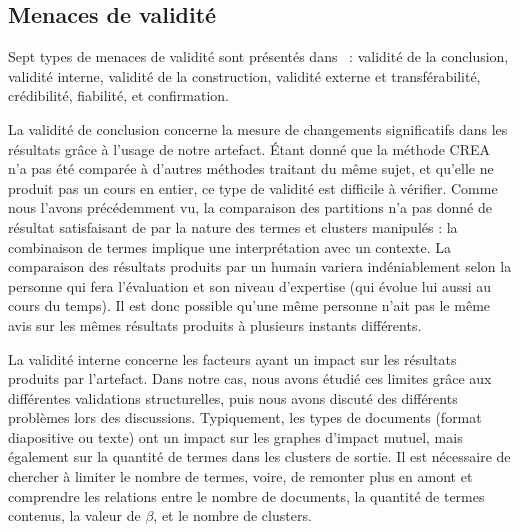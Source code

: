 \clearpage %
\newpage   %


\subsection{Menaces de validité}
\label{subsection:Conclusion:Synthese:MenacesValidite}

Sept types de menaces de validité sont présentés dans~\cite{feldt2010validity} : validité de la conclusion, validité interne, validité de la construction, validité externe et transférabilité, crédibilité, fiabilité, et confirmation.

\bigskip

La validité de conclusion concerne la mesure de changements significatifs dans les résultats grâce à l'usage de notre artefact.
Étant donné que la méthode CREA n'a pas été comparée à d'autres méthodes traitant du même sujet, et qu'elle ne produit pas un cours en entier, ce type de validité est difficile à vérifier.
Comme nous l'avons précédemment vu, la comparaison des partitions n'a pas donné de résultat satisfaisant de par la nature des termes et clusters manipulés : la combinaison de termes implique une interprétation avec un contexte.
La comparaison des résultats produits par un humain variera indéniablement selon la personne qui fera l'évaluation et son niveau d'expertise (qui évolue lui aussi au cours du temps).
Il est donc possible qu'une même personne n'ait pas le même avis sur les mêmes résultats produits à plusieurs instants différents.

\bigskip

La validité interne concerne les facteurs ayant un impact sur les résultats produits par l'artefact.
Dans notre cas, nous avons étudié ces limites grâce aux différentes validations structurelles, puis nous avons discuté des différents problèmes lors des discussions.
Typiquement, les types de documents (format diapositive ou texte) ont un impact sur les graphes d'impact mutuel, mais également sur la quantité de termes dans les clusters de sortie.
Il est nécessaire de chercher à limiter le nombre de termes, voire, de remonter plus en amont et comprendre les relations entre le nombre de documents, la quantité de termes contenus, la valeur de $ \beta $, et le nombre de clusters.

